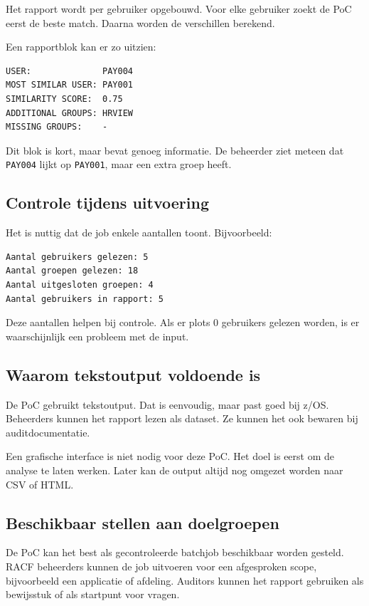 Het rapport wordt per gebruiker opgebouwd. Voor elke gebruiker zoekt de PoC eerst de beste match. Daarna worden de verschillen berekend.

Een rapportblok kan er zo uitzien:

\begin{verbatim}
USER:              PAY004
MOST SIMILAR USER: PAY001
SIMILARITY SCORE:  0.75
ADDITIONAL GROUPS: HRVIEW
MISSING GROUPS:    -
\end{verbatim}

Dit blok is kort, maar bevat genoeg informatie. De beheerder ziet meteen dat \texttt{PAY004} lijkt op \texttt{PAY001}, maar een extra groep heeft.

\subsection*{Controle tijdens uitvoering}

Het is nuttig dat de job enkele aantallen toont. Bijvoorbeeld:

\begin{verbatim}
Aantal gebruikers gelezen: 5
Aantal groepen gelezen: 18
Aantal uitgesloten groepen: 4
Aantal gebruikers in rapport: 5
\end{verbatim}

Deze aantallen helpen bij controle. Als er plots 0 gebruikers gelezen worden, is er waarschijnlijk een probleem met de input.

\subsection*{Waarom tekstoutput voldoende is}

De PoC gebruikt tekstoutput. Dat is eenvoudig, maar past goed bij z/OS. Beheerders kunnen het rapport lezen als dataset. Ze kunnen het ook bewaren bij auditdocumentatie.

Een grafische interface is niet nodig voor deze PoC. Het doel is eerst om de analyse te laten werken. Later kan de output altijd nog omgezet worden naar CSV of HTML.

\subsection*{Beschikbaar stellen aan doelgroepen}

De PoC kan het best als gecontroleerde batchjob beschikbaar worden gesteld. RACF beheerders kunnen de job uitvoeren voor een afgesproken scope, bijvoorbeeld een applicatie of afdeling. Auditors kunnen het rapport gebruiken als bewijsstuk of als startpunt voor vragen.

